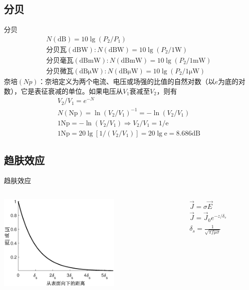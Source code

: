 \subsection{分贝}
\begin{frame}{分贝}
\begin{align*}
    &N(\mathrm{dB})=10\lg(P_2/P_1)\\
    &\text{分贝瓦}(\mathrm{dBW}):N(\mathrm{dBW})=10\lg(P_2/1\mathrm{W})\\
    &\text{分贝毫瓦}(\mathrm{dBmW}):N(\mathrm{dBmW})=10\lg(P_2/1\mathrm{mW})\\
    &\text{分贝微瓦}(\mathrm{dB\mu W}):N(\mathrm{dB\mu W})=10\lg(P_2/1\mathrm{\mu W})
\end{align*}
奈培$(Np)$：奈培定义为两个电流、电压或场强的比值的自然对数（以$e$为底的对数），它是表征衰减的单位。如果电压从$V_1$衰减至$V_2$，则有\\
\begin{align*}
    &V_2/V_1=e^{-N}\\
    &N(\mathrm{Np})=\ln(V_2/V_1)^{-1}=-\ln(V_2/V_1)\\
    &1\mathrm{Np}=-\ln(V_2/V_1)\Rightarrow V_2/V_1=1/\mathrm{e}\\
    &1\mathrm{Np}=20\lg[1/(V_2/V_1)]=20\lg\mathrm{e}=8.686\mathrm{dB}
\end{align*}
\end{frame}

\subsection{趋肤效应}
\begin{frame}{趋肤效应}
    \begin{columns}
        \begin{column}{0.6\linewidth}
            \centering
            \includegraphics[width=6cm]{fig2_9.eps}
        \end{column}
        \begin{column}{0.4\linewidth}
            \centering
            \begin{align*}
                &\vec J = \sigma \vec E\\
                &\vec J = \vec J_0 e^{-z/\delta_s}\\
                &\delta_s = \frac{1}{\sqrt{\pi f\mu\sigma}}
            \end{align*}
        \end{column}
    \end{columns}

\end{frame}